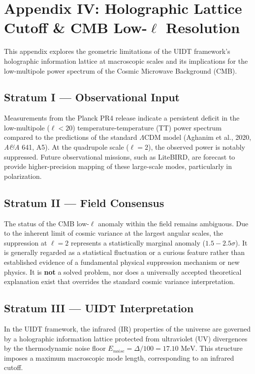 \newpage
\section{Appendix IV: Holographic Lattice Cutoff \& CMB Low-$\ell$ Resolution}
\label{app:holographic_cmb_cutoff}

This appendix explores the geometric limitations of the UIDT framework's holographic information lattice at macroscopic scales and its implications for the low-multipole power spectrum of the Cosmic Microwave Background (CMB).

\subsection*{Stratum I — Observational Input}
Measurements from the Planck PR4 release indicate a persistent deficit in the low-multipole ($\ell < 20$) temperature-temperature (TT) power spectrum compared to the predictions of the standard $\Lambda$CDM model (Aghanim et al., 2020, \textit{A\&A} 641, A5). At the quadrupole scale ($\ell = 2$), the observed power is notably suppressed. Future observational missions, such as LiteBIRD, are forecast to provide higher-precision mapping of these large-scale modes, particularly in polarization.

\subsection*{Stratum II — Field Consensus}
The status of the CMB low-$\ell$ anomaly within the field remains ambiguous. Due to the inherent limit of cosmic variance at the largest angular scales, the suppression at $\ell=2$ represents a statistically marginal anomaly ($1.5 - 2.5\sigma$). It is generally regarded as a statistical fluctuation or a curious feature rather than established evidence of a fundamental physical suppression mechanism or new physics. It is \textbf{not} a solved problem, nor does a universally accepted theoretical explanation exist that overrides the standard cosmic variance interpretation.

\subsection*{Stratum III — UIDT Interpretation}
In the UIDT framework, the infrared (IR) properties of the universe are governed by a holographic information lattice protected from ultraviolet (UV) divergences by the thermodynamic noise floor $E_{noise} = \Delta / 100 = 17.10\text{ MeV}$. This structure imposes a maximum macroscopic mode length, corresponding to an infrared cutoff.

